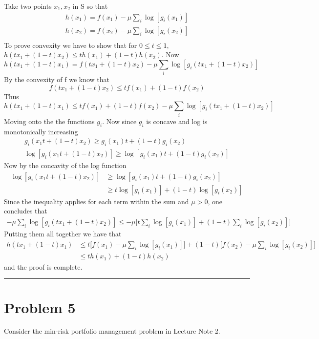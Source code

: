 \documentclass{article} %
\begin{document}
Take two points $x_1, x_2$ in S so that 
\begin{gather*}
h(x_1) = f(x_1) - \mu \sum_{i} \log[ g_i(x_1)] \\ 
h(x_2) = f(x_2) - \mu \sum_{i} \log[ g_i(x_2)] \\ 
\end{gather*}
To prove convexity we have to show that for $0 \leq t \leq 1$, $h(tx_1 + (1 -t)x_2) \leq t h(x_1) + (1 - t)h(x_2)$. Now
\[
h(t x_1 + (1 - t)x_1) = f(t x_1 + (1 - t)x_2) - \mu \sum_i \log[g_i(tx_1 + (1-t)x_2)]
\]
By the convexity of f we know that 
\[
f(t x_1 + (1- t)x_2) \leq t f(x_1) + (1 - t)f(x_2)
\]
Thus 
\[
h(t x_1 + (1 - t)x_1) \leq t f(x_1) + (1 - t)f(x_2)- \mu \sum_i \log[g_i(tx_1 + (1-t)x_2)]
\]
Moving onto the the functions $g_i$. Now since $g_i$ is concave and log is monotonically increasing
\begin{gather*}
g_i(x_1 t + (1 - t)x_2) \geq g_i(x_1) t + (1 -t) g_i(x_2) \\ 
\log[g_i(x_1 t + (1 - t)x_2)] \geq \log[g_i(x_1) t + (1 -t) g_i(x_2)]
\end{gather*}
Now by the concavity of the log function 
\begin{equation*}
\begin{aligned}
\log[g_i(x_1 t + (1 - t)x_2)] &\geq \log[g_i(x_1) t + (1 -t) g_i(x_2)]  \\ 
&\geq t \log[g_i(x_1)] + (1-t)\log[g_i(x_2)]
\end{aligned}
\end{equation*}
Since the inequality applies for each term within the sum and $\mu > 0$, one concludes that
\begin{gather*}
- \mu \sum_{i} \log[g_i(tx_1 + (1-t)x_2)] \leq -\mu\bigg[ t \sum_{i} \log[g_i(x_1)] + (1 - t)\sum_i \log[g_i(x_2)] \bigg] 
\end{gather*}
Putting them all together we have that 
\begin{equation*}
\begin{aligned}
h(t x_1 + (1 - t)x_1) &\leq t\big[f(x_1) - \mu \sum_i \log[g_i(x_1)]\big]  + (1 - t) \big[ f(x_2) - \mu \sum_i \log[g_i(x_2)] \big] \\ 
&\leq t h(x_1) + (1 - t)h(x_2)
\end{aligned}
\end{equation*}
and the proof is complete. 

\rule{\textwidth}{1pt}
\section*{Problem 5}
Consider the min-risk portfolio management problem in Lecture Note 2. 
\end{document}
